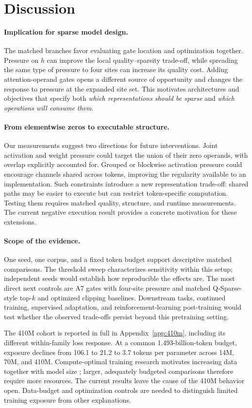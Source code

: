 \section{Discussion}
\label{sec:discussion}
\paragraph{Implication for sparse model design.}
The matched branches favor evaluating gate location and optimization together.
Pressure on $h$ can improve the local quality--sparsity trade-off, while
spreading the same type of pressure to four sites can increase its quality
cost. Adding attention-operand gates opens a different source of opportunity
and changes the response to pressure at the expanded site set.
This motivates architectures and objectives that specify both
\emph{which representations should be sparse} and \emph{which operations
will consume them}.

\paragraph{From elementwise zeros to executable structure.}
Our measurements suggest two directions for future interventions. Joint
activation and weight pressure could target the union of their zero operands,
with overlap explicitly accounted for. Grouped or blockwise activation
pressure could encourage channels shared across tokens, improving the
regularity available to an implementation. Such constraints introduce a
new representation trade-off: shared paths may be easier to execute but can
restrict token-specific computation. Testing them requires matched quality,
structure, and runtime measurements. The current negative execution result
provides a concrete motivation for these extensions.

\paragraph{Scope of the evidence.}
One seed, one corpus, and a fixed token budget support descriptive matched
comparisons. The threshold sweep characterizes sensitivity within this
setup; independent seeds would establish how reproducible the effects are.
The most direct next controls are A7 gates with four-site pressure and
matched Q-Sparse-style top-$k$ and optimized clipping baselines.
Downstream tasks, continued training, supervised adaptation, and
reinforcement-learning post-training would test whether the observed
trade-offs persist beyond this pretraining setting.

The 410M cohort is reported in full in Appendix~\ref{app:410m}, including
its different within-family loss response. At a common 1.493-billion-token
budget, exposure declines from 106.1 to 21.2 to 3.7 tokens per parameter
across 14M, 70M, and 410M. Compute-optimal training research motivates
increasing data together with model size \citep{hoffmann2022training};
larger, adequately budgeted comparisons therefore require more resources.
The current results leave the cause of the 410M behavior open. Data-budget
and optimization controls are needed to distinguish limited training
exposure from other explanations.
